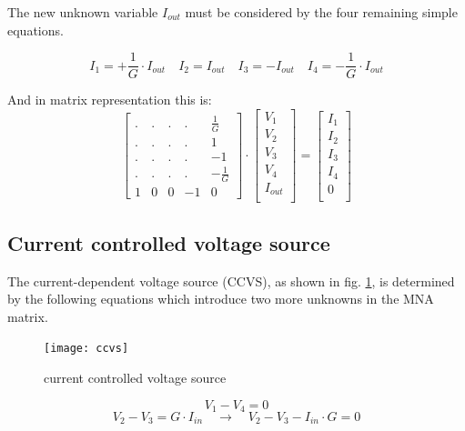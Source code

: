 The new unknown variable $I_{out}$ must be considered by the four
remaining simple equations.

\begin{equation}
I_{1} = +\frac{1}{G}\cdot I_{out} \quad I_{2} = I_{out} \quad I_{3} = -I_{out} \quad I_{4} = -\frac{1}{G}\cdot I_{out}
\end{equation}

And in matrix representation this is:
\begin{equation}
\begin{bmatrix}
.&.&.&.& \frac{1}{G}\\
.&.&.&.& 1\\
.&.&.&.& -1\\
.&.&.&.& -\frac{1}{G}\\
1 & 0 & 0 & -1 & 0
\end{bmatrix}
\cdot
\begin{bmatrix}
V_{1}\\
V_{2}\\
V_{3}\\
V_{4}\\
I_{out}\\
\end{bmatrix}
=
\begin{bmatrix}
I_{1}\\
I_{2}\\
I_{3}\\
I_{4}\\
0\\
\end{bmatrix}
\end{equation}

\subsection{Current controlled voltage source}
\label{sec:ccvs}

The current-dependent voltage source (CCVS), as shown in fig.
\ref{fig:ccvs}, is determined by the following equations which
introduce two more unknowns in the MNA matrix.

\begin{figure}[ht]
\begin{center}
\texttt{[image: ccvs]}
\end{center}
\caption{current controlled voltage source}
\label{fig:ccvs}
\end{figure}
\FloatBarrier

\begin{equation}
V_{1} - V_{4} = 0
\end{equation}
\begin{equation}
V_{2} - V_{3} = G\cdot I_{in}
\quad \rightarrow \quad
V_{2} - V_{3} - I_{in}\cdot G = 0
\label{eq:ccvs}
\end{equation}


